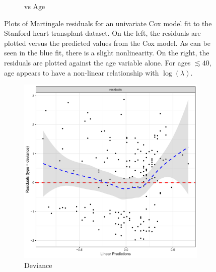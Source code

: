 \begin{figure}[H]
\begin{subfigure}[c]{0.48\textwidth}
  \caption{vs Age}
  \label{fig:cox:martingale_residuals:age}
  \end{subfigure}
\caption{
Plots of Martingale residuals for
an univariate Cox model fit to the Stanford heart transplant dataset.
On the left, the residuals are plotted versus the predicted values from the Cox model.
As can be seen in the blue fit, there is a slight nonlinearity.
On the right, the residuals are plotted against the age variable alone.
For ages $\lesssim 40$, age appears to have a non-linear relationship with $\log\left(\lambda\right)$.
}
\label{fig:cox:martingale_residuals}
\end{figure}

\begin{figure}[H]
\centering
  \begin{subfigure}[c]{0.48\textwidth}\centering
  \includegraphics[width=\textwidth]{figures/survival/stanford_cox_age_deviance_residuals}
  \caption{Deviance}
  \label{fig:cox:outliers:deviance}
  \end{subfigure}
  ~
  \begin{subfigure}[c]{0.48\textwidth}\centering

\end{subfigure}
\end{figure}
